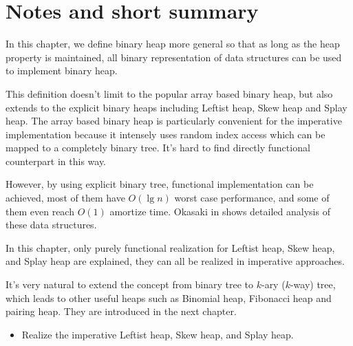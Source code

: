 \documentclass{article}
\begin{document}
\section{Notes and short summary}

In this chapter, we define binary heap more general
so that as long as the heap property is maintained, all binary
representation of data structures can be used to implement binary heap.

This definition doesn't limit to the popular array based binary
heap, but also extends to the explicit binary heaps including Leftist
heap, Skew heap and Splay heap. The array based binary heap
is particularly convenient for the imperative implementation
because it intensely uses random index access which can be mapped to
a completely binary tree. It's hard to find directly functional
counterpart in this way.

However, by using explicit binary tree, functional implementation
can be achieved, most of them have $O(\lg n)$ worst case
performance, and some of them even reach $O(1)$ amortize time.
Okasaki in \cite{okasaki-book} shows detailed analysis of these data
structures.

In this chapter, only purely functional realization for Leftist heap,
Skew heap, and Splay heap are explained, they can all be realized
in imperative approaches.

It's very natural to extend the concept from binary tree to
$k$-ary ($k$-way) tree, which leads to other useful heaps such as
Binomial heap, Fibonacci heap and pairing heap. They are introduced
in the next chapter.

\begin{Exercise}
\begin{itemize}
\item Realize the imperative Leftist heap, Skew heap, and Splay heap.
\end{itemize}
\end{Exercise}
\end{document}

